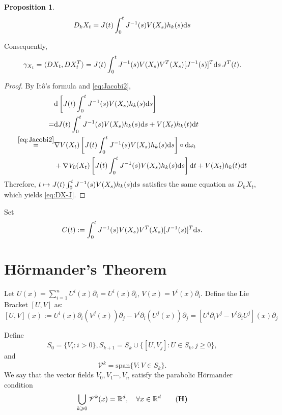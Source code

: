 \documentclass[twoside, 12pt]{book}
\numberwithin{equation}{chapter}
\newtheorem{proposition}[theorem]{Proposition}
\def\mR{{\mathbb R}}
\def\sV{{\mathscr V}}
\def\l{\left}
\def\r{\right}
\def\<{\langle}
\def\>{\rangle}
\def\geq{\geqslant}
\def\p{\partial}
\def\d{\text{\rm{d}}}
\begin{document}
    \begin{proposition}
    	\begin{equation}\label{eq:DX-J}
    		D_kX_t=J(t) \int_0^t J^{-1}(s) V(X_s) h_k(s) \d s
    	\end{equation}
    \end{proposition}
    Consequently, 
    \begin{equation}
    	\gamma_{X_t}=\< D X_t, D X^{T}_t\>=  J(t)  \int_0^t J^{-1}(s) V(X_s) V^{T}(X_s) [J^{-1}(s)]^{T} \d s \, J^T(t). 
    \end{equation}
    \begin{proof}
    	By It\^o's formula and \eqref{eq:Jacobi2}, 
    	\begin{align*}
    		&\d \l[ J(t) \int_0^t J^{-1}(s) V(X_s) h_k(s) \d s \r]\\
    	=&\d J(t)  \int_0^t J^{-1}(s) V(X_s) h_k(s) \d s + V(X_t) h_k(t) \d t \\
    	\overset{\eqref{eq:Jacobi2}}{=}& \nabla V(X_t) \l[J(t)\int_0^t J^{-1}(s) V(X_s) h_k(s) \d s \r]  \circ \d \omega_t \\
    	&+ \nabla V_0(X_t) \l[J(t)\int_0^t J^{-1}(s) V(X_s) h_k(s) \d s \r]  \d t + V(X_t) h_k(t) \d t 
    	\end{align*}
    	Therefore, $t\mapsto J(t) \int_0^t J^{-1}(s) V(X_s) h_k(s) \d s$ satisfies the same equation as $D_k X_t$, which yields \eqref{eq:DX-J}. 
    \end{proof}
    Set 
    \[
        C(t):= \int_0^t J^{-1}(s) V(X_s) V^{T}(X_s) [J^{-1}(s)]^{T} \d s. 
    \]
   
    
    

    \section{Hörmander's Theorem}
	
	Let $U(x)=\sum_{i=1}^n U^i(x)\p_i=U^i(x)\partial_i$, $V(x)=V^i(x)\p_i$. Define the Lie Bracket  $[U, V]$ as: 
	\[
	     [U,V](x):= U^i(x) \p_i(V^j(x))\p_j-V^i\p_i(U^j(x))\p_j= [U^i \p_iV^j  -V^i\p_i U^j](x)\p_j
	\]


	Define 
	$$S_0=\{V_i : i>0\}, S_{k+1}=S_k\cup \{[U,V_j]: U\in S_k, j\geq 0\}, $$
	and 
	$$\sV^k=\mbox{span} \{V: V\in S_k\}. $$
	We say that the vector fields $V_0, V_1\cdots, V_n$  satisfy the parabolic H\"ormander condition 
	\begin{align}\label{aspt:H}
	    \bigcup_{k\geq 0} \sV^k(x) = \mR^d, \quad \forall x\in \mR^d   \tag{\bf{H}}
	\end{align} 
	
\end{document}
